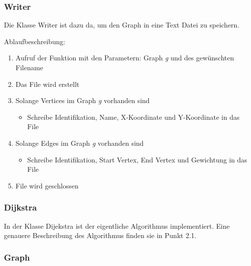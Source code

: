 \documentclass[a4paper,titlepage]{article}
\begin{document}
\subsubsection{Writer}

Die Klasse Writer ist dazu da, um den Graph in eine Text Datei zu speichern.

Ablaufbeschreibung:

\begin{enumerate}
\item Aufruf der Funktion mit den Parametern: Graph \emph{g} und des gewünschten Filename
\item Das File wird erstellt
\item Solange Vertices im Graph \emph{g} vorhanden sind
\begin{itemize}\item Schreibe Identifikation, Name, X-Koordinate und Y-Koordinate in das File\end{itemize}
\item Solange Edges im Graph \emph{g} vorhanden sind
\begin{itemize}\item Schreibe Identifikation, Start Vertex, End Vertex und Gewichtung in das File\end{itemize}
\item File wird geschlossen
\end{enumerate}

\subsubsection{Dijkstra}

In der Klasse Dijekstra ist der eigentliche Algorithmus implementiert. Eine genauere Beschreibung des Algorithmus finden sie in Punkt 2.1.

\subsubsection{Graph}
\end{document}
